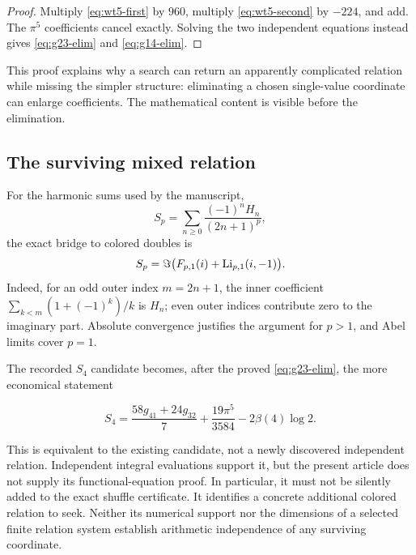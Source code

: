 \begin{proof}
Multiply \eqref{eq:wt5-first} by \(960\), multiply
\eqref{eq:wt5-second} by \(-224\), and add.
The \(\pi^5\) coefficients cancel exactly. Solving the two
independent equations instead gives \eqref{eq:g23-elim} and
\eqref{eq:g14-elim}.
\end{proof}

This proof explains why a search can return an apparently complicated
relation while missing the simpler structure: eliminating a chosen
single-value coordinate can enlarge coefficients.
The mathematical content is visible before the elimination.

\subsection{The surviving mixed relation}

For the harmonic sums used by the manuscript,
\[
S_p=\sum_{n\ge0}\frac{(-1)^nH_n}{(2n+1)^p},
\]
the exact bridge to colored doubles is
\begin{equation}
S_p=\Im\bigl(F_{p,1}(i)+\operatorname{Li}_{p,1}(i,-1)\bigr).
\label{eq:S-mixed}
\end{equation}
Indeed, for an odd outer index \(m=2n+1\), the inner coefficient
\(\sum_{k<m}(1+(-1)^k)/k\) is \(H_n\); even outer indices contribute
zero to the imaginary part. Absolute convergence justifies the argument
for \(p>1\), and Abel limits cover \(p=1\).

The recorded \(S_4\) candidate becomes, after the proved
\eqref{eq:g23-elim}, the more economical statement
\begin{conjecture}\label{conj:S4}
\begin{equation}
S_4=\frac{58g_{41}+24g_{32}}7
       +\frac{19\pi^5}{3584}-2\beta(4)\log2.
\label{eq:S4-short}
\end{equation}
\end{conjecture}
This is equivalent to the existing candidate, not a newly discovered
independent relation. Independent integral evaluations support it,
but the present article does not supply its functional-equation proof.
In particular, it must not be silently added to the exact shuffle
certificate. It identifies a concrete additional colored relation to
seek. Neither its numerical support nor the dimensions of a selected
finite relation system establish arithmetic independence of any
surviving coordinate.
